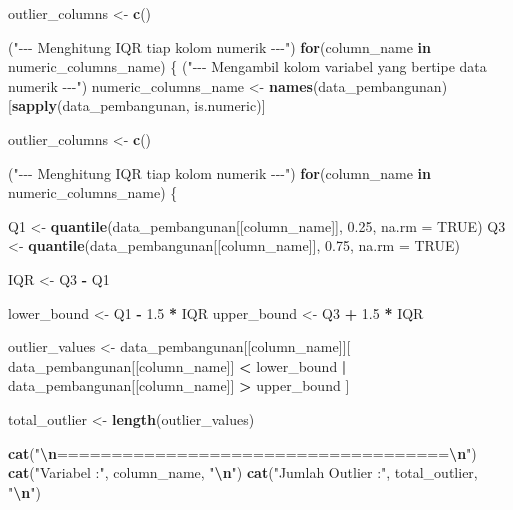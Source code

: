 \documentclass[
  12pt,
]{article}
\newenvironment{Shaded}{\begin{snugshade}}{\end{snugshade}}
\newcommand{\AttributeTok}[1]{\textcolor[rgb]{0.13,0.29,0.53}{#1}}
\newcommand{\ConstantTok}[1]{\textcolor[rgb]{0.56,0.35,0.01}{#1}}
\newcommand{\ControlFlowTok}[1]{\textcolor[rgb]{0.13,0.29,0.53}{\textbf{#1}}}
\newcommand{\FloatTok}[1]{\textcolor[rgb]{0.00,0.00,0.81}{#1}}
\newcommand{\FunctionTok}[1]{\textcolor[rgb]{0.13,0.29,0.53}{\textbf{#1}}}
\newcommand{\NormalTok}[1]{#1}
\newcommand{\OtherTok}[1]{\textcolor[rgb]{0.56,0.35,0.01}{#1}}
\newcommand{\SpecialCharTok}[1]{\textcolor[rgb]{0.81,0.36,0.00}{\textbf{#1}}}
\newcommand{\StringTok}[1]{\textcolor[rgb]{0.31,0.60,0.02}{#1}}
\begin{document}
\begin{Shaded}
\begin{Highlighting}[]
\NormalTok{outlier\_columns }\OtherTok{\textless{}{-}} \FunctionTok{c}\NormalTok{()}

\NormalTok{(}\StringTok{"{-}{-}{-} Menghitung IQR tiap kolom numerik {-}{-}{-}"}\NormalTok{)}
\ControlFlowTok{for}\NormalTok{(column\_name }\ControlFlowTok{in}\NormalTok{ numeric\_columns\_name) \{}
\NormalTok{  (}\StringTok{"{-}{-}{-} Mengambil kolom variabel yang bertipe data numerik {-}{-}{-}"}\NormalTok{)}
\NormalTok{  numeric\_columns\_name }\OtherTok{\textless{}{-}} \FunctionTok{names}\NormalTok{(data\_pembangunan)[}\FunctionTok{sapply}\NormalTok{(data\_pembangunan, is.numeric)]}
  
\NormalTok{  outlier\_columns }\OtherTok{\textless{}{-}} \FunctionTok{c}\NormalTok{()}
  
\NormalTok{  (}\StringTok{"{-}{-}{-} Menghitung IQR tiap kolom numerik {-}{-}{-}"}\NormalTok{)}
  \ControlFlowTok{for}\NormalTok{(column\_name }\ControlFlowTok{in}\NormalTok{ numeric\_columns\_name) \{}
  
\NormalTok{    Q1 }\OtherTok{\textless{}{-}} \FunctionTok{quantile}\NormalTok{(data\_pembangunan[[column\_name]], }\FloatTok{0.25}\NormalTok{, }\AttributeTok{na.rm =} \ConstantTok{TRUE}\NormalTok{)}
\NormalTok{    Q3 }\OtherTok{\textless{}{-}} \FunctionTok{quantile}\NormalTok{(data\_pembangunan[[column\_name]], }\FloatTok{0.75}\NormalTok{, }\AttributeTok{na.rm =} \ConstantTok{TRUE}\NormalTok{)}
  
\NormalTok{    IQR }\OtherTok{\textless{}{-}}\NormalTok{ Q3 }\SpecialCharTok{{-}}\NormalTok{ Q1}
  
\NormalTok{    lower\_bound }\OtherTok{\textless{}{-}}\NormalTok{ Q1 }\SpecialCharTok{{-}} \FloatTok{1.5} \SpecialCharTok{*}\NormalTok{ IQR}
\NormalTok{    upper\_bound }\OtherTok{\textless{}{-}}\NormalTok{ Q3 }\SpecialCharTok{+} \FloatTok{1.5} \SpecialCharTok{*}\NormalTok{ IQR}
  
\NormalTok{    outlier\_values }\OtherTok{\textless{}{-}}\NormalTok{ data\_pembangunan[[column\_name]][}
\NormalTok{      data\_pembangunan[[column\_name]] }\SpecialCharTok{\textless{}}\NormalTok{ lower\_bound }\SpecialCharTok{|}
\NormalTok{      data\_pembangunan[[column\_name]] }\SpecialCharTok{\textgreater{}}\NormalTok{ upper\_bound}
\NormalTok{    ]}
  
\NormalTok{    total\_outlier }\OtherTok{\textless{}{-}} \FunctionTok{length}\NormalTok{(outlier\_values)}
  
    \FunctionTok{cat}\NormalTok{(}\StringTok{"}\SpecialCharTok{\textbackslash{}n}\StringTok{====================================}\SpecialCharTok{\textbackslash{}n}\StringTok{"}\NormalTok{)}
    \FunctionTok{cat}\NormalTok{(}\StringTok{"Variabel :"}\NormalTok{, column\_name, }\StringTok{"}\SpecialCharTok{\textbackslash{}n}\StringTok{"}\NormalTok{)}
    \FunctionTok{cat}\NormalTok{(}\StringTok{"Jumlah Outlier :"}\NormalTok{, total\_outlier, }\StringTok{"}\SpecialCharTok{\textbackslash{}n}\StringTok{"}\NormalTok{)}
  

\end{Highlighting}
\end{Shaded}
\end{document}
